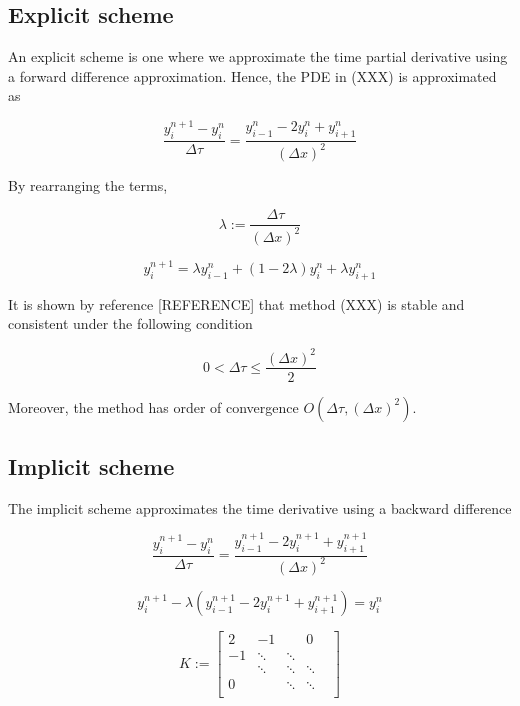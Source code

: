 \subsection{Explicit scheme}

An explicit scheme is one where we approximate the time partial derivative using
a forward difference approximation. Hence, the PDE in (XXX) is approximated as

\begin{equation}
  \frac{y^{n+1}_{i} - y^{n}_{i}}{\Delta \tau} = \frac{y^{n}_{i-1} - 2y^{n}_{i} + y^{n}_{i+1}}{(\Delta x)^2}
\end{equation}

By rearranging the terms,

\begin{equation}
  \lambda := \frac{\Delta \tau}{(\Delta x)^2}
\end{equation}

\begin{equation}
  y^{n+1}_i = \lambda y^{n}_{i-1} + (1 - 2\lambda)y^{n}_{i} + \lambda y^{n}_{i+1}
\end{equation}

It is shown by reference [REFERENCE] that method (XXX) is stable and consistent 
under the following condition

\begin{equation}
  0 < \Delta \tau \le \frac{(\Delta x)^2}{2}
\end{equation}

Moreover, the method has order of convergence $O(\Delta \tau, (\Delta x)^{2})$.

\subsection{Implicit scheme}

The implicit scheme approximates the time derivative using a backward difference

\begin{equation}
  \frac{y^{n+1}_{i} - y^{n}_{i}}{\Delta \tau} = \frac{y^{n+1}_{i-1} - 2y^{n+1}_{i} + y^{n+1}_{i+1}}{(\Delta x)^2}
\end{equation}

\begin{equation}
  y^{n+1}_{i} - \lambda (y^{n+1}_{i-1} - 2y^{n+1}_{i} + y^{n+1}_{i+1}) = y^{n}_{i}  
\end{equation}

\begin{equation}
  K := \begin{bmatrix}
    2 & -1     & & 0 \\ 
   -1 & \ddots & \ddots \\
      & \ddots & \ddots & \ddots \\
    0 & & \ddots & \ddots & \\
  \end{bmatrix} 
\end{equation}

